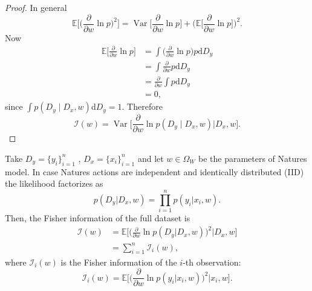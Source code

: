 \begin{proof}
	In general
	\begin{equation}
		\mathbb{E}\bigg[\bigg(\frac{\partial}{\partial w} \ln p\bigg)^2\bigg] 
		= \operatorname{Var}\bigg[\frac{\partial}{\partial w} \ln p\bigg] + 
		\bigg(\mathbb{E}\bigg[\frac{\partial}{\partial w} \ln p\bigg]\bigg)^2.
	\end{equation}
	Now
	\begin{align}
		\mathbb{E}\bigg[\frac{\partial}{\partial w} \ln p\bigg] 
		&= \int \bigg(\frac{\partial}{\partial w} \ln p\bigg)  p \mathrm{d}D_y \\
		&= \int \frac{\partial}{\partial w} p \mathrm{d}D_y\\
		&= \frac{\partial}{\partial w} \int  p \mathrm{d}D_y \\
		&= 0,
	\end{align}
	since $\int p(D_y \mid D_x, w) \mathrm{d}D_y = 1$. Therefore
	\begin{equation}
		\mathcal{I}(w) = \operatorname{Var}\bigg[\frac{\partial}{\partial w} \ln p(D_y \mid D_x, w) \bigg| D_x, w\bigg].
	\end{equation}
\end{proof}

\begin{theorem}
	\label{thm:fisher_sample}
	Take $D_y= \{y_i\}_{i=1}^n$ , $D_x = \{x_i\}_{i=1}^n$ and let $w \in \Omega_W$ be the parameters of Natures model. In case Natures actions are independent and identically distributed (IID) the likelihood factorizes as
	\begin{equation}
		p(D_y | D_x, w) = \prod_{i=1}^{n} p(y_i | x_i, w).
	\end{equation}
	Then, the Fisher information of the full dataset is
	\begin{equation}
		\begin{split}
			\mathcal{I}(w) 
			&= \mathbb{E}\Bigg[\Big(\frac{\partial}{\partial w} \ln p(D_y | D_x, w)\Big)^2 \Bigg| D_x, w \Bigg]\\
			&= \sum_{i=1}^{n} \mathcal{I}_i(w),
		\end{split}
	\end{equation}
	where $\mathcal{I}_i(w)$ is the Fisher information of the $i$-th observation:
	\begin{equation}
		\mathcal{I}_i(w) = \mathbb{E}\Bigg[\Bigg(\frac{\partial}{\partial w} \ln p(y_i | x_i, w)\Bigg)^2 \Bigg| x_i, w\Bigg].
	\end{equation}
\end{theorem}

